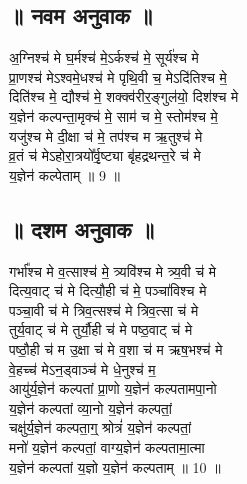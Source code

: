 \subsection{॥ नवम अनुवाक ॥}
अ॒ग्निश्च॑ मे घ॒र्मश्च॑ मे॒ऽर्कश्च॑ मे॒ सूर्य॑श्च मे\\
प्रा॒णश्च॑ मेऽश्वमे॒धश्च॑ मे पृथि॒वी च॒ मेऽदि॑तिश्च मे॒\\
दिति॑श्च मे॒ द्यौश्च॑ मे॒ शक्क्व॑रीर॒ङ्गुल॑यो॒ दिश॑श्च मे\\
य॒ज्ञेन॑ कल्पन्ता॒मृक्च॑ मे॒ साम॑ च मे॒ स्तोम॑श्च मे॒\\
यजु॑श्च मे दी॒क्षा च॑ मे॒ तप॑श्च म ऋ॒तुश्च॑ मे\\
व्र॒तं च॑ मेऽहोरा॒त्रयो᳚र्वृ॒ष्ट्या बृ॑हद्रथन्त॒रे च॑ मे\\
य॒ज्ञेन॑ कल्पेताम् ॥ 9 ॥\\
\subsection{॥ दशम अनुवाक ॥}
गर्भा᳚श्च मे व॒त्साश्च॑ मे॒ त्र्यवि॑श्च मे त्र्य॒वी च॑ मे\\
दित्य॒वाट् च॑ मे दित्यौ॒ही च॑ मे॒ पञ्चा॑विश्च मे\\
पञ्चा॒वी च॑ मे त्रिव॒त्सश्च॑ मे त्रिव॒त्सा च॑ मे\\
तुर्य॒वाट् च॑ मे तुर्यौ॒ही च॑ मे पष्ठ॒वाट् च॑ मे\\
पष्ठौ॒ही च॑ म उ॒क्षा च॑ मे व॒शा च॑ म ऋष॒भश्च॑ मे\\
वे॒हच्च॑ मेऽन॒ड्वाञ्च॑ मे धे॒नुश्च॑ म॒\\
आयु॑र्य॒ज्ञेन॑ कल्पतां प्रा॒णो य॒ज्ञेन॑ कल्पतामपा॒नो\\
य॒ज्ञेन॑ कल्पतां व्या॒नो य॒ज्ञेन॑ कल्पतां॒\\
चक्षु॑र्य॒ज्ञेन॑ कल्पता॒ग्॒ श्रोत्रं॑ य॒ज्ञेन॑ कल्पतां॒\\
मनो॑ य॒ज्ञेन॑ कल्पतां॒ वाग्य॒ज्ञेन॑ कल्पतामा॒त्मा\\
य॒ज्ञेन॑ कल्पतां य॒ज्ञो य॒ज्ञेन॑ कल्पताम् ॥ 10 ॥\\
